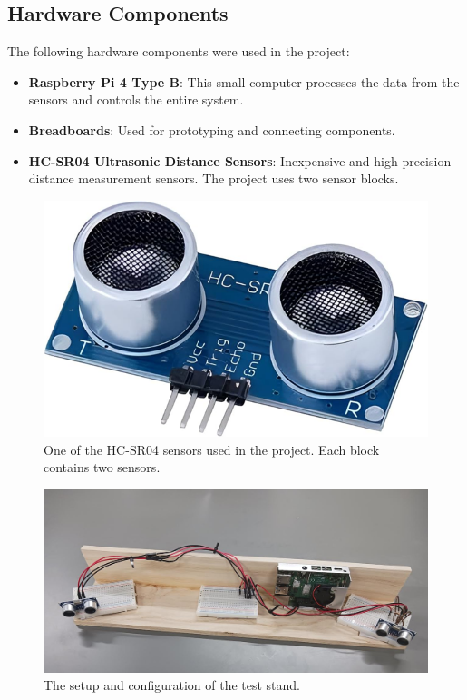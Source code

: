 \documentclass[12pt,a4paper]{article}
\begin{document}
\subsection{Hardware Components}
The following hardware components were used in the project:
\begin{itemize}
    \item \textbf{Raspberry Pi 4 Type B}: This small computer processes the data from the sensors and controls the entire system.
    \item \textbf{Breadboards}: Used for prototyping and connecting components.
    \item \textbf{HC-SR04 Ultrasonic Distance Sensors}: Inexpensive and high-precision distance measurement sensors. The project uses two sensor blocks.
\end{itemize}

\begin{figure}[!htp]
    \centering
    \includegraphics[scale=0.3]{../IoT Materials/article images/6-Infrared-sensor.png}
    \caption{One of the HC-SR04 sensors used in the project. Each block contains two sensors.}
\end{figure}

\begin{figure}[!htp]
    \centering
    \includegraphics[scale=0.3]{../IoT Materials/article images/7-Test-stand.png}
    \caption{The setup and configuration of the test stand.}
\end{figure}
\end{document}
